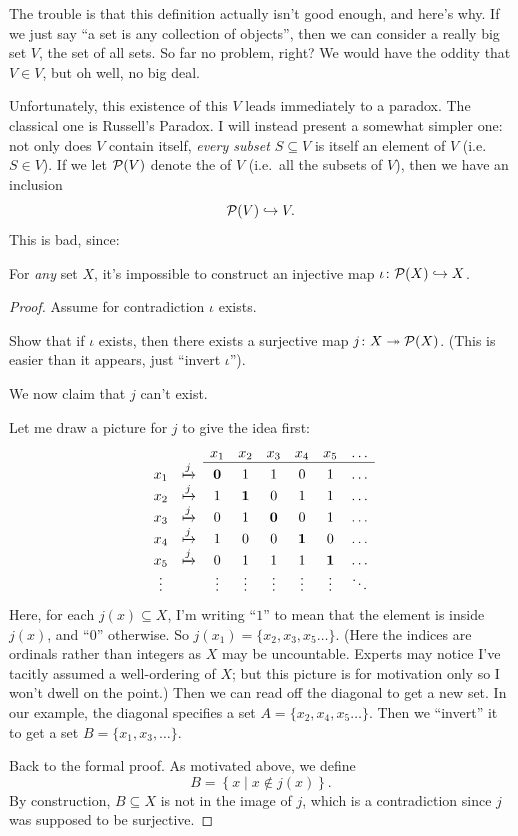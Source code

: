 The trouble is that this definition actually isn't good enough, and here's why.
If we just say ``a set is any collection of objects'',
then we can consider a really big set $V$, the set of all sets.
So far no problem, right?
We would have the oddity that $V \in V$,
but oh well, no big deal.

Unfortunately, this existence of this $V$ leads immediately to a paradox.
The classical one is Russell's Paradox.
I will instead present a somewhat simpler one:
not only does $V$ contain itself, \emph{every subset $S \subseteq V$}
is itself an element of $V$ (i.e. $S \in V$).
If we let $\mathcal P(V)$ denote the  of $V$
(i.e.\ all the subsets of $V$), then we have an inclusion
\[ \mathcal P(V) \hookrightarrow V. \]
This is bad, since:
\begin{lemma}
	\label{lem:cantor_diag}
	For \emph{any} set $X$, it's impossible to construct an injective
	map $\iota \colon \mathcal P(X) \hookrightarrow X$.
\end{lemma}
\begin{proof}
	Assume for contradiction $\iota$ exists.
	\begin{exercise}
		Show that if $\iota$ exists,
		then there exists a surjective map $j \colon X \twoheadrightarrow \mathcal P(X)$.
		(This is easier than it appears, just ``invert $\iota$'').
	\end{exercise}
	We now claim that $j$ can't exist.

	Let me draw a picture for $j$ to give the idea first:
	\[
		\begin{array}{cccccccc}
			&& x_1 & x_2 & x_3 & x_4 & x_5 & \dots \\ \cline{3-8}
			x_1 & \xmapsto{j} & \mathbf0 & 1 & 1 & 0 & 1 & \dots \\
			x_2 & \xmapsto{j} & 1 & \mathbf1 & 0 & 1 & 1 & \dots \\
			x_3 & \xmapsto{j} & 0 & 1 & \mathbf0 & 0 & 1 & \dots \\
			x_4 & \xmapsto{j} & 1 & 0 & 0 & \mathbf1 & 0 & \dots \\
			x_5 & \xmapsto{j} & 0 & 1 & 1 & 1 & \mathbf1 & \dots \\
			\vdots && \vdots & \vdots & \vdots & \vdots & \vdots & \ddots
		\end{array}
	\]
	Here, for each $j(x) \subseteq X$, I'm writing ``$1$'' to mean that
	the element is inside $j(x)$, and ``$0$'' otherwise.
	So $j(x_1) = \{x_2, x_3, x_5 \dots\}$.
	(Here the indices are ordinals rather than integers
	as $X$ may be uncountable.
	Experts may notice I've tacitly assumed a well-ordering of $X$;
	but this picture is for motivation only so I won't dwell on the point.)
	Then we can read off the diagonal to get a new set.
	In our example, the diagonal specifies a set
	$A = \{x_2, x_4, x_5 \dots\}$.
	Then we ``invert'' it to get a set $B = \{x_1, x_3, \dots\}$.

	Back to the formal proof. As motivated above, we define
	\[ B = \left\{ x \mid x \notin j(x) \right\}. \]
	By construction, $B \subseteq X$ is not in the image of $j$,
	which is a contradiction since $j$ was supposed to be surjective.
\end{proof}

